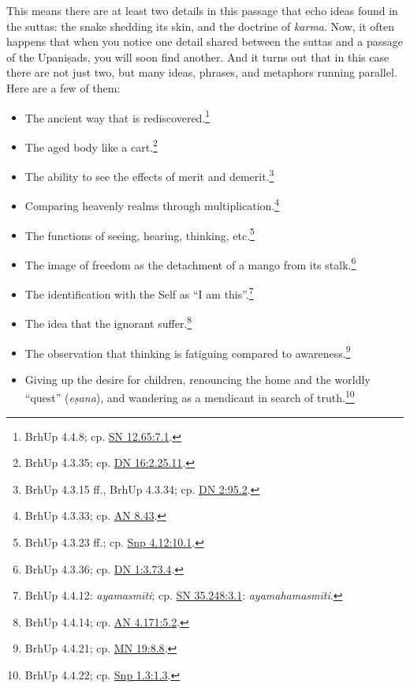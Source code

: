 \documentclass[12pt,openany]{book}%
\begin{document}
This means there are at least two details in this passage that echo ideas found in the suttas: the snake shedding its skin, and the doctrine of \textit{karma}. Now, it often happens that when you notice one detail shared between the suttas and a passage of the \textsanskrit{Upaniṣads}, you will soon find another. And it turns out that in this case there are not just two, but many ideas, phrases, and metaphors running parallel. Here are a few of them:

\begin{itemize}%
\item The ancient way that is rediscovered.\footnote{BrhUp 4.4.8; cp. \href{https://suttacentral.net/sn12.65/en/sujato\#7.1}{SN 12.65:7.1}. }%
\item The aged body like a cart.\footnote{BrhUp 4.3.35; cp. \href{https://suttacentral.net/dn16/en/sujato\#2.25.11}{DN 16:2.25.11}. }%
\item The ability to see the effects of merit and demerit.\footnote{BrhUp 4.3.15 ff., BrhUp 4.3.34; cp. \href{https://suttacentral.net/dn2/en/sujato\#95.2}{DN 2:95.2}. }%
\item Comparing heavenly realms through multiplication.\footnote{BrhUp 4.3.33; cp. \href{https://suttacentral.net/an8.43/en/sujato}{AN 8.43}. }%
\item The functions of seeing, hearing, thinking, etc.\footnote{BrhUp 4.3.23 ff.; cp. \href{https://suttacentral.net/snp4.12/en/sujato\#10.1}{Snp 4.12:10.1}. }%
\item The image of freedom as the detachment of a mango from its stalk.\footnote{BrhUp 4.3.36; cp. \href{https://suttacentral.net/dn1/en/sujato\#3.73.4}{DN 1:3.73.4}. }%
\item The identification with the Self as “I am this”.\footnote{BrhUp 4.4.12: \textit{\textsanskrit{ayamasmīti}}; cp. \href{https://suttacentral.net/sn35.248/en/sujato\#3.1}{SN 35.248:3.1}: \textit{\textsanskrit{ayamahamasmīti}}. }%
\item The idea that the ignorant suffer.\footnote{BrhUp 4.4.14; cp. \href{https://suttacentral.net/an4.171/en/sujato\#5.2}{AN 4.171:5.2}. }%
\item The observation that thinking is fatiguing compared to awareness.\footnote{BrhUp 4.4.21; cp. \href{https://suttacentral.net/mn19/en/sujato\#8.8}{MN 19:8.8}. }%
\item Giving up the desire for children, renouncing the home and the worldly “quest” (\textit{\textsanskrit{eṣana}}), and wandering as a mendicant in search of truth.\footnote{BrhUp 4.4.22; cp. \href{https://suttacentral.net/snp1.3/en/sujato\#1.3}{Snp 1.3:1.3}. }%

\end{itemize}
\end{document}
